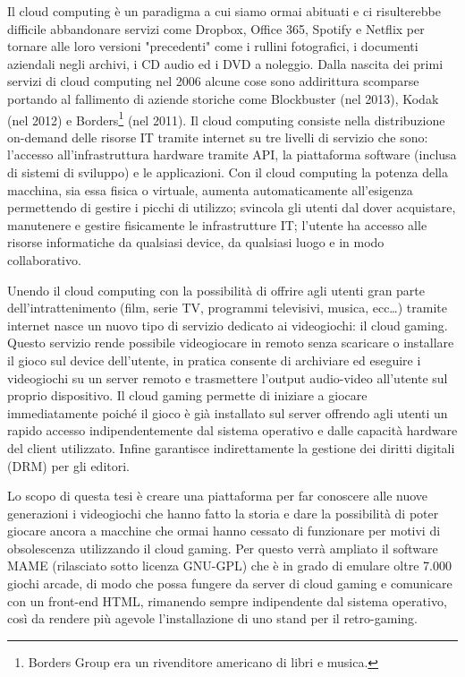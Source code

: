 Il cloud computing è un paradigma a cui siamo ormai abituati e ci risulterebbe difficile abbandonare servizi come Dropbox, Office 365, Spotify e Netflix per tornare alle loro versioni "precedenti" come i rullini fotografici, i documenti aziendali negli archivi, i CD audio ed i DVD a noleggio. Dalla nascita dei primi servizi di cloud computing nel 2006 alcune cose sono addirittura scomparse portando al fallimento di aziende storiche come Blockbuster (nel 2013), Kodak (nel 2012) e Borders\footnote{Borders Group era un rivenditore americano di libri e musica.} (nel 2011). Il cloud computing consiste nella distribuzione on-demand delle risorse IT tramite internet su tre livelli di servizio che sono: l'accesso all'infrastruttura hardware tramite API, la piattaforma software (inclusa di sistemi di sviluppo) e le applicazioni. Con il cloud computing la potenza della macchina, sia essa fisica o virtuale, aumenta automaticamente all'esigenza permettendo di gestire i picchi di utilizzo; svincola gli utenti dal dover acquistare, manutenere e gestire fisicamente le infrastrutture IT; l'utente ha accesso alle risorse informatiche da qualsiasi device, da qualsiasi luogo e in modo collaborativo.

Unendo il cloud computing con la possibilità di offrire agli utenti gran parte dell'intrattenimento (film, serie TV, programmi televisivi, musica, ecc\dots) tramite internet nasce un nuovo tipo di servizio dedicato ai videogiochi: il cloud gaming. Questo servizio rende possibile videogiocare in remoto senza scaricare o installare il gioco sul device dell'utente, in pratica consente di archiviare ed eseguire i videogiochi su un server remoto e trasmettere l'output audio-video all'utente sul proprio dispositivo. Il cloud gaming permette di iniziare a giocare immediatamente poiché il gioco è già installato sul server offrendo agli utenti un rapido accesso indipendentemente dal sistema operativo e dalle capacità hardware del client utilizzato. Infine garantisce indirettamente la gestione dei diritti digitali (DRM) per gli editori.

Lo scopo di questa tesi è creare una piattaforma per far conoscere alle nuove generazioni i videogiochi che hanno fatto la storia e dare la possibilità di poter giocare ancora a macchine che  ormai hanno cessato di funzionare per motivi di obsolescenza utilizzando il cloud gaming. Per questo verrà ampliato il software MAME (rilasciato sotto licenza GNU-GPL) che è in grado di emulare oltre 7.000 giochi arcade, di modo che possa fungere da server di cloud gaming e comunicare con un front-end HTML, rimanendo sempre indipendente dal sistema operativo, così da rendere più agevole l’installazione di uno stand per il retro-gaming.


